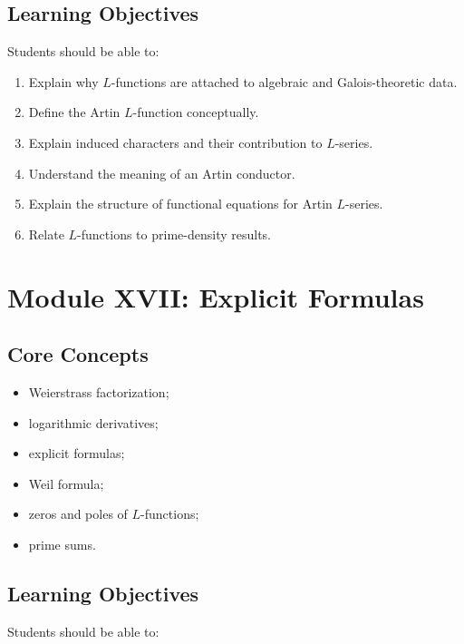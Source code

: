 \documentclass[11pt,a4paper]{article}
\begin{document}
\subsection{Learning Objectives}

Students should be able to:

\begin{enumerate}
    \item Explain why \(L\)-functions are attached to algebraic
    and Galois-theoretic data.
    \item Define the Artin \(L\)-function conceptually.
    \item Explain induced characters and their contribution to
    \(L\)-series.
    \item Understand the meaning of an Artin conductor.
    \item Explain the structure of functional equations for
    Artin \(L\)-series.
    \item Relate \(L\)-functions to prime-density results.
\end{enumerate}

\section{Module XVII: Explicit Formulas}

\subsection{Core Concepts}

\begin{itemize}
    \item Weierstrass factorization;
    \item logarithmic derivatives;
    \item explicit formulas;
    \item Weil formula;
    \item zeros and poles of \(L\)-functions;
    \item prime sums.
\end{itemize}

\subsection{Learning Objectives}

Students should be able to:
\end{document}
